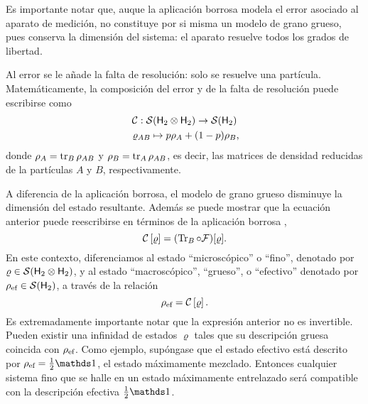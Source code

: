 Es importante notar que, auque la aplicación borrosa modela el error asociado al aparato de medición, no constituye por si misma un modelo de grano grueso, pues conserva la dimensión del sistema: el aparato resuelve todos los grados de libertad.

Al error se le añade la falta de resolución: solo se resuelve una partícula. \acnote{\checkmark} Matemáticamente, la composición del error y de la falta de resolución puede escribirse como
\begin{gather}
    \mcC:\mcS(\hilbert_2 \otimes \hilbert_2)\to \mcS(\hilbert_2)\nonumber\\
    \varrho_{AB} \mapsto p\rho_A+(1-p)\rho_B\rlap{,}\nonumber
\end{gather}
donde $\rho_A=\tr_B \rho_{AB}$ y $\rho_B=\tr_A \rho_{AB}$, es decir, las matrices de densidad reducidas de la partículas $A$ y $B$, respectivamente.


A diferencia de la aplicación borrosa, el modelo de grano grueso disminuye la dimensión del estado resultante. Además se puede mostrar que la ecuación anterior puede reescribirse en términos de la aplicación borrosa \cite{FuzzyMeasurements},
\begin{equation}
\mathcal{C}\left[\varrho\right]=(\Tr_{B}\circ\mathcal{F})[\varrho].\nonumber
\end{equation}
En este contexto, diferenciamos al estado ``microscópico'' o ``fino'', denotado por $\varrho\in \mathcal{S}({\sf H}_2\otimes{\sf H}_2)$, y al estado ``macroscópico'', ``grueso'', o  ``efectivo'' denotado por $\rho_{\text{ef}}\in \mathcal{S}({\sf H}_2)$, a través de la relación
\begin{equation}
    \rho_{\text{ef}}=\mathcal{C}\left[\varrho\right].\nonumber
\end{equation}
Es extremadamente importante notar que la expresión anterior no es invertible. Pueden existir una infinidad de estados $\varrho$ tales que su descripción gruesa coincida con $\rho_{\text{ef}}$. Como ejemplo, supóngase que el estado efectivo está descrito por $\rho_{\ef}=\frac{1}{2}\Id$, el estado máximamente mezclado. Entonces cualquier sistema fino que se halle en un estado máximamente entrelazado será compatible con la descripción efectiva $\frac{1}{2}\Id$.

